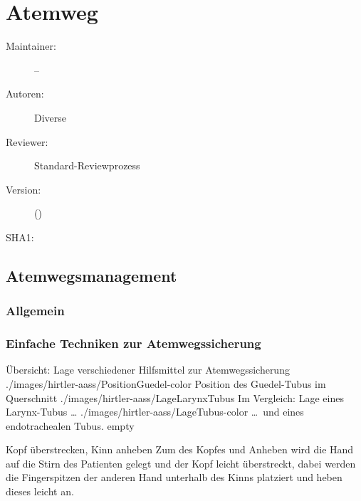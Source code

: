 \def\ChapterCode{FORTBILDUNG}
	\chapter
[\CO{[FORTBILDUNG]} Atemweg]
{Atemweg}
\label{chp:ADVANCED-Atemweg}

\ChapterIntro
{%

}
{%
\begin{description}
  \item[Maintainer:] --
  \item[Autoren:] Diverse
  \item[Reviewer:] Standard-Reviewprozess
  \item[Version:] {\VarDocVersionTypeName} ({\VarDocVersionTypeDescription})
  \item[SHA1:] {\DocGitCommit}
\end{description}

{\TxTeilkapitelAASS}
}



\clearpage %

\section{Atemwegsmanagement}
\subsection{Allgemein}
\subsection{Einfache Techniken zur Atemwegssicherung}

\begin{PictureSeriesWide}{}{Übersicht: Lage verschiedener
Hilfsmittel zur Atemwegssicherung
\label{fig:uebersicht-lage-atemwegshilfen}}
{./images/hirtler-aass/PositionGuedel-color}
{Position des Guedel-Tubus im Querschnitt}
{./images/hirtler-aass/LageLarynxTubus}
{Im Vergleich: Lage eines Larynx-Tubus \ldots} 
{./images/hirtler-aass/LageTubus-color}
{\ldots\ und eines endotrachealen Tubus.}
{empty}
{}
\end{PictureSeriesWide}

\Text
{Kopf überstrecken, Kinn anheben}
{Zum  des Kopfes und Anheben wird 
die Hand
auf die Stirn des Patienten gelegt und der Kopf
leicht überstreckt, dabei werden die Fingerspitzen
der anderen Hand unterhalb des Kinns platziert und heben
dieses leicht an. \cite{Erc2010Sec4}}
{}



